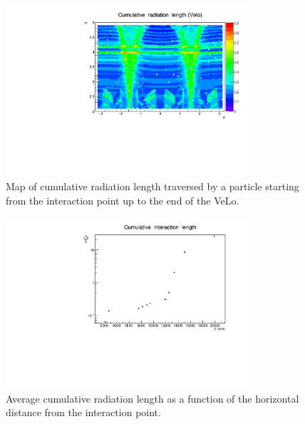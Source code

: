 \begin{center}
\begin{figure}[h]
\centering \includegraphics[width=0.8\textwidth]{Detector/figs/validation/radlenght/radlgh_prof_ID1.pdf}
\caption{Map of cumulative radiation length traversed by a particle starting from
the interaction point up to the end of the VeLo.}
\label{fig:radlmap}
\end{figure}

\begin{figure}[h!]
\centering \includegraphics[width=0.8\textwidth]{Detector/figs/validation/radlenght/cuminterLength_vs_Z.pdf}
\caption{Average cumulative radiation length as a function of the horizontal 
distance from the interaction point.
}
\label{fig:cumradlZ}
\end{figure}
\end{center}


